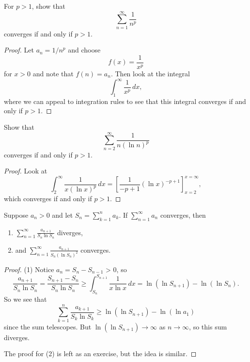 \begin{example}
  For $p > 1$, show that
  \[
    \sum_{n = 1}^\infty \frac{1}{n^p}
  \]
  converges if and only if $p > 1$.
\end{example}

\begin{proof}
  Let $a_n = 1 / n^p$ and choose
  \[
    f(x) = \frac{1}{x^p}
  \]
  for $x > 0$ and note that $f(n) = a_n$.
  Then look at the integral
  \[
    \int_1^\infty \frac{1}{x^p}\, dx,
  \]
  where we can appeal to integration rules to see
  that this integral converges if and only if
  $p > 1$.
\end{proof}

\begin{example}
  Show that
  \[
    \sum_{n = 2}^\infty \frac{1}{n (\ln n)^p}
  \]
  converges if and only if $p > 1$.
\end{example}

\begin{proof}
  Look at
  \[
    \int_2^\infty \frac{1}{x (\ln x)^p}\, dx
    = \left[\frac{1}{-p + 1} (\ln x)^{-p + 1}\right]_{x = 2}^{x = \infty},
  \]
  which converges if and only if $p > 1$.
\end{proof}

\begin{example}
  Suppose $a_n > 0$ and let $S_n = \sum_{k = 1}^n a_k$.
  If $\sum_{n = 1}^\infty a_n$ converges, then
  \begin{enumerate}
    \item $\displaystyle \sum_{n = 1}^\infty \frac{a_{n + 1}}{S_n \ln S_n}$ diverges,
    \item and $\displaystyle \sum_{n = 1}^\infty \frac{a_{n + 1}}{S_n (\ln S_n)^2}$ converges.
  \end{enumerate}
\end{example}

\begin{proof}
  (1) Notice $a_n = S_n - S_{n - 1}$ > 0, so
  \[
    \frac{a_{n + 1}}{S_n \ln S_n}
    = \frac{S_{n + 1} - S_n}{S_n \ln S_n}
    \ge \int_{S_n}^{S_{n + 1}} \frac{1}{x \ln x}\, dx
    = \ln(\ln S_{n + 1}) - \ln(\ln S_n).
  \]
  So we see that
  \[
    \sum_{k = 1}^n \frac{a_{k + 1}}{S_k \ln S_k}
    \ge \ln(\ln S_{n + 1}) - \ln(\ln a_1)
  \]
  since the sum telescopes. But
  $\ln(\ln S_{n + 1}) \to \infty$ as $n \to \infty$,
  so this sum diverges.

  The proof for (2) is left as an exercise, but the
  idea is similar.
\end{proof}

